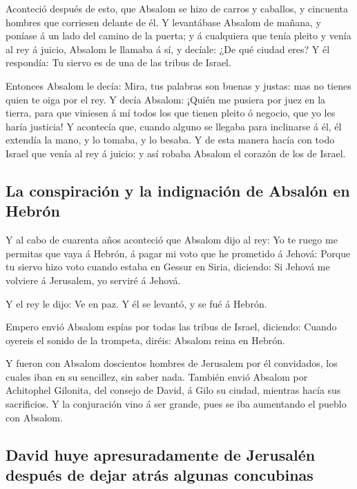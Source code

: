  Aconteció después de esto, que Absalom se hizo de carros
y caballos, y cincuenta hombres que corriesen delante de él.
 Y levantábase Absalom de mañana, y poníase á un lado del
camino de la puerta; y á cualquiera que tenía pleito y venía al rey á
juicio, Absalom le llamaba á sí, y decíale: ¿De qué ciudad eres? Y él
respondía: Tu siervo es de una de las tribus de Israel.

 Entonces Absalom le decía: Mira, tus palabras son buenas
y justas: mas no tienes quien te oiga por el rey.  Y decía
Absalom: ¡Quién me pusiera por juez en la tierra, para que viniesen á mí
todos los que tienen pleito ó negocio, que yo les haría justicia!
 Y acontecía que, cuando alguno se llegaba para inclinarse
á él, él extendía la mano, y lo tomaba, y lo besaba.  Y de
esta manera hacía con todo Israel que venía al rey á juicio: y así
robaba Absalom el corazón de los de Israel.

\hypertarget{la-conspiraciuxf3n-y-la-indignaciuxf3n-de-absaluxf3n-en-hebruxf3n}{%
\subsection{La conspiración y la indignación de Absalón en
Hebrón}\label{la-conspiraciuxf3n-y-la-indignaciuxf3n-de-absaluxf3n-en-hebruxf3n}}

 Y al cabo de cuarenta años aconteció que Absalom dijo al
rey: Yo te ruego me permitas que vaya á Hebrón, á pagar mi voto que he
prometido á Jehová:  Porque tu siervo hizo voto cuando
estaba en Gessur en Siria, diciendo: Si Jehová me volviere á Jerusalem,
yo serviré á Jehová.

 Y el rey le dijo: Ve en paz. Y él se levantó, y se fué á
Hebrón.

 Empero envió Absalom espías por todas las tribus de
Israel, diciendo: Cuando oyereis el sonido de la trompeta, diréis:
Absalom reina en Hebrón.

 Y fueron con Absalom doscientos hombres de Jerusalem por
él convidados, los cuales iban en su sencillez, sin saber nada.
 También envió Absalom por Achitophel Gilonita, del
consejo de David, á Gilo su ciudad, mientras hacía sus sacrificios. Y la
conjuración vino á ser grande, pues se iba aumentando el pueblo con
Absalom.

\hypertarget{david-huye-apresuradamente-de-jerusaluxe9n-despuuxe9s-de-dejar-atruxe1s-algunas-concubinas}{%
\subsection{David huye apresuradamente de Jerusalén después de dejar
atrás algunas
concubinas}\label{david-huye-apresuradamente-de-jerusaluxe9n-despuuxe9s-de-dejar-atruxe1s-algunas-concubinas}}

